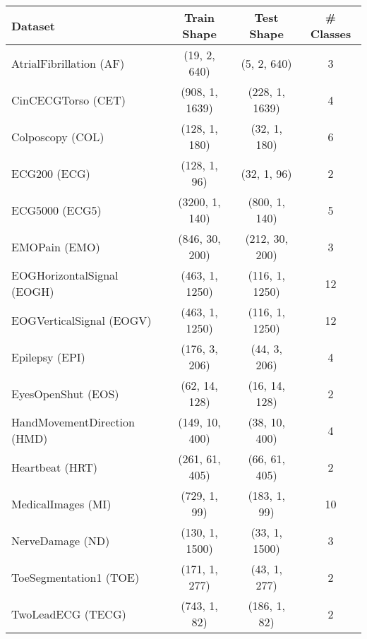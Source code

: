 
\begin{tabular}{l c c c}
\toprule
\textbf{Dataset} & \textbf{Train Shape} & \textbf{Test Shape} & \textbf{\# Classes} \\
\midrule
AtrialFibrillation (AF) & (19, 2, 640) & (5, 2, 640) & 3 \\
CinCECGTorso (CET) & (908, 1, 1639) & (228, 1, 1639) & 4 \\
Colposcopy (COL) & (128, 1, 180) & (32, 1, 180) & 6 \\
ECG200 (ECG) & (128, 1, 96) & (32, 1, 96) & 2 \\
ECG5000 (ECG5) & (3200, 1, 140) & (800, 1, 140) & 5 \\
EMOPain (EMO) & (846, 30, 200) & (212, 30, 200) & 3 \\
EOGHorizontalSignal (EOGH) & (463, 1, 1250) & (116, 1, 1250) & 12 \\
EOGVerticalSignal (EOGV) & (463, 1, 1250) & (116, 1, 1250) & 12 \\
Epilepsy (EPI) & (176, 3, 206) & (44, 3, 206) & 4 \\
EyesOpenShut (EOS) & (62, 14, 128) & (16, 14, 128) & 2 \\
HandMovementDirection (HMD) & (149, 10, 400) & (38, 10, 400) & 4 \\
Heartbeat (HRT) & (261, 61, 405) & (66, 61, 405) & 2 \\
MedicalImages (MI) & (729, 1, 99) & (183, 1, 99) & 10 \\
NerveDamage (ND) & (130, 1, 1500) & (33, 1, 1500) & 3 \\
ToeSegmentation1 (TOE) & (171, 1, 277) & (43, 1, 277) & 2 \\
TwoLeadECG (TECG) & (743, 1, 82) & (186, 1, 82) & 2 \\
\bottomrule
\end{tabular}
